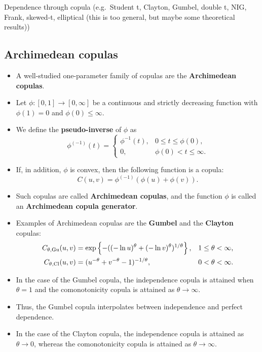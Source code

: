 
Dependence through copula (e.g.\ Student t, Clayton, Gumbel, double t,
NIG, Frank, skewed-t, elliptical (this is too general, but maybe some
theoretical results))

\subsection{Archimedean copulas}
\label{sec:archimedean-copulas}

\begin{itemize}
\item A well-studied one-parameter family of copulas are the {\bf 
    Archimedean copulas}. 
\item Let $\phi:[0,1]\rightarrow[0,\infty]$ be a
  continuous and strictly decreasing function with $\phi(1)=0$ and
  $\phi(0)\leq\infty$.
\item  We define the {\bf pseudo-inverse} of $\phi$ as 
  \begin{equation*}
    \phi^{(-1)}(t)=
    \begin{cases}
      \phi^{-1}(t), &0\leq t\leq \phi(0),\\
      0, &\phi(0)<t\leq\infty.
    \end{cases}
  \end{equation*}
\item If, in addition, $\phi$ is convex, then the following function
  is a copula: 
  \begin{equation*}
    C(u,v)=\phi^{(-1)}(\phi(u)+\phi(v)).
  \end{equation*}
  \vspace*{-\baselineskip}
\item Such copulas are called {\bf Archimedean copulas}, and the
  function $\phi$ is called an {\bf Archimedean copula generator}. 
\item Examples of Archimedean copulas are the {\bf Gumbel} and the
  {\bf Clayton} copulas:
  \begin{align*}
    C_{\theta,{\rm Gu}}(u,v) &= \exp\left\{-((-\ln u)^\theta + (-\ln
                               v)^\theta)^{1/\theta}\right\},& 1\leq \theta<\infty,\\
    C_{\theta,{\rm Cl}}(u,v)&= (u^{-\theta} + v^{-\theta}
                              -1)^{-1/\theta}, & 0<\theta<\infty. 
  \end{align*}
\item In the case of the Gumbel copula, the independence copula is 
  attained when $\theta=1$ and the comonotonicity copula is attained
  as $\theta\rightarrow\infty$. 
\item Thus, the Gumbel copula interpolates between independence and
  perfect dependence.  
\item In the case of the Clayton copula, the independence copula is
  attained as $\theta\rightarrow 0$, whereas the comonotonicity
  copula is attained as $\theta\rightarrow\infty$. 
\end{itemize}

